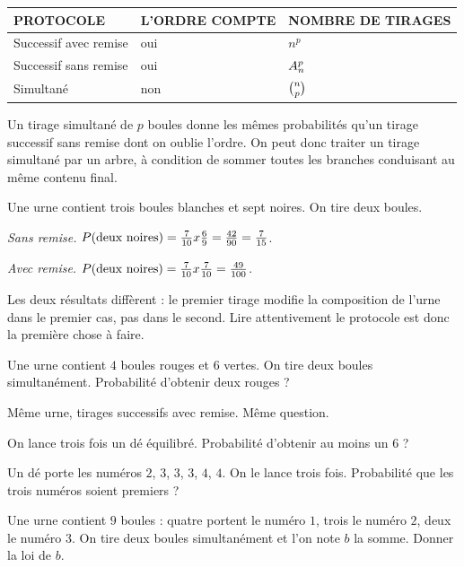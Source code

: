 \begin{propriete}
\begin{center}
\setlength{\tabcolsep}{7pt}
\renewcommand{\arraystretch}{1.3}
\begin{tabular}{@{}lll@{}}
\toprule
\textsf{\footnotesize\bfseries PROTOCOLE} &
\textsf{\footnotesize\bfseries L'ORDRE COMPTE} &
\textsf{\footnotesize\bfseries NOMBRE DE TIRAGES} \\
\midrule
Successif avec remise & oui & $n^{p}$ \\
Successif sans remise & oui & $\arrang{p}{n}$ \\
Simultané & non & $\combi{p}{n}$ \\
\bottomrule
\end{tabular}
\end{center}
\end{propriete}

\begin{remarque}
Un tirage simultané de $p$ boules donne les mêmes probabilités qu'un tirage
successif sans remise dont on oublie l'ordre. On peut donc traiter un tirage
simultané par un arbre, à condition de sommer toutes les branches conduisant
au même contenu final.
\end{remarque}

\begin{exemple}
Une urne contient trois boules blanches et sept noires. On tire deux boules.

\emph{Sans remise.} $\proba{\text{deux noires}}
= \frac{7}{10} \times \frac69 = \frac{42}{90} = \frac{7}{15}$.

\emph{Avec remise.} $\proba{\text{deux noires}}
= \frac{7}{10} \times \frac{7}{10} = \frac{49}{100}$.

Les deux résultats diffèrent : le premier tirage modifie la composition de
l'urne dans le premier cas, pas dans le second. Lire attentivement le
protocole est donc la première chose à faire.
\end{exemple}

\begin{entrainement}
\exo[\niveau{1}] Une urne contient $4$ boules rouges et $6$ vertes. On tire
deux boules simultanément. Probabilité d'obtenir deux rouges ?

\exo[\niveau{1}] Même urne, tirages successifs avec remise. Même question.

\exo[\niveau{2}] On lance trois fois un dé équilibré. Probabilité d'obtenir au
moins un $6$ ?

\exo[\niveau{2}] Un dé porte les numéros $2$, $3$, $3$, $3$, $4$, $4$. On le
lance trois fois. Probabilité que les trois numéros soient premiers ?

\exo[\niveau{3}] Une urne contient $9$ boules : quatre portent le numéro $1$,
trois le numéro $2$, deux le numéro $3$. On tire deux boules simultanément et
l'on note $b$ la somme. Donner la loi de $b$.
\end{entrainement}

